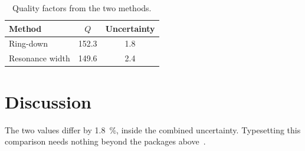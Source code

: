 \documentclass[twocolumn,10pt]{article}
\begin{document}
\begin{table}[t]
  \centering
  \caption{Quality factors from the two methods.}
  \label{tab:q}
  \begin{tabular}{lS[table-format=3.1]S[table-format=1.1]}
    \toprule
    Method & {$Q$} & {Uncertainty} \\
    \midrule
    Ring-down       & 152.3 & 1.8 \\
    Resonance width & 149.6 & 2.4 \\
    \bottomrule
  \end{tabular}
\end{table}

\section{Discussion}
The two values differ by \SI{1.8}{\percent}, inside the combined uncertainty. Typesetting this comparison
needs nothing beyond the packages above~\citep{lamport1994,mittelbach2004}.



\end{document}
